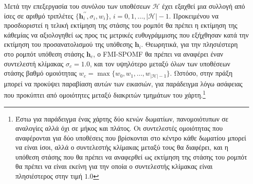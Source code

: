 Μετά την επεξεργασία του συνόλου των υποθέσεων $\mathcal{H}$ έχει εξαχθεί μια
συλλογή από ίσες σε αριθμό τριπλέτες $\{\bm{h}_i^{\prime\prime}, \sigma_i,
w_i\}$, $i = 0,1,\dots,|\mathcal{H}|-1$. Προκειμένου να προσδιοριστεί η τελική
εκτίμηση της στάσης του ρομπότ θα πρέπει η εκτίμηση της κάθεμίας να αξιολογηθεί
ως προς τις μετρικές ευθυγράμμισης που εξήχθησαν κατά την εκτίμηση του
προσανατολισμού της υπόθεσης $\bm{h}_i$.  Θεωρητικά, για την πλησιέστερη στο
ρομπότ υπόθεση στάσης $\bm{h}_c$, ο FMI-SPOMF θα πρέπει να αναφέρει έναν
συντελεστή κλίμακας $\sigma_c = 1.0$, και τον υψηλότερο μεταξύ όλων των
υποθέσεων στάσης βαθμό ομοιότητας $w_c = \max\{w_0, w_1, \dots,
w_{|\mathcal{H}|-1}\}$. Ωστόσο, στην πράξη μπορεί να προκύψει παραβίαση αυτών
των εικασιών, για παράδειγμα λόγω ασάφειας που προκύπτει από ομοιότητες μεταξύ
διακριτών τμημάτων του χάρτη.\footnote{Έστω για παράδειγμα ένας χάρτης δύο
κενών δωματίων, πανομοιότυπων σε αναλογίες αλλά όχι σε μήκος και πλάτος. Oι
συντελεστές ομοιότητας που αναφέρονται για δύο υποθέσεις που βρίσκονται στο
κέντρο κάθε δωματίου μπορεί να είναι ίσοι, αλλά ο συντελεστής κλίμακας μεταξύ
τους θα διαφέρει, και η υπόθεση στάσης που θα πρέπει να αναφερθεί ως εκτίμηση
της στάσης του ρομπότ θα πρέπει να είναι εκείνη για την οποία ο συντελεστής
κλίμακας είναι πλησιέστερος στην τιμή $1.0$}

